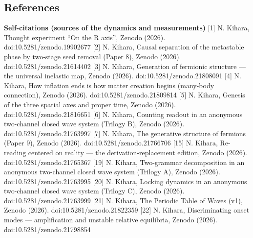 \documentclass[
]{article}
\begin{document}
\subsection{References}\label{references}

\textbf{Self-citations (sources of the dynamics and measurements)}
{[}1{]} N. Kihara, Thought experiment ``On the R axis'', Zenodo (2026).
doi:10.5281/zenodo.19902677 {[}2{]} N. Kihara, Causal separation of the
metastable phase by two-stage seed removal (Paper 8), Zenodo (2026).
doi:10.5281/zenodo.21614402 {[}3{]} N. Kihara, Generation of fermionic
structure --- the universal inelastic map, Zenodo (2026).
doi:10.5281/zenodo.21808091 {[}4{]} N. Kihara, How inflation ends is how
matter creation begins (many-body connection), Zenodo (2026).
doi:10.5281/zenodo.21809814 {[}5{]} N. Kihara, Genesis of the three
spatial axes and proper time, Zenodo (2026). doi:10.5281/zenodo.21816651
{[}6{]} N. Kihara, Counting readout in an anonymous two-channel closed
wave system (Trilogy B), Zenodo (2026). doi:10.5281/zenodo.21763997
{[}7{]} N. Kihara, The generative structure of fermions (Paper 9),
Zenodo (2026). doi:10.5281/zenodo.21766706 {[}15{]} N. Kihara,
Re-reading centered on reality --- the derivation-replacement edition,
Zenodo (2026). doi:10.5281/zenodo.21765367 {[}19{]} N. Kihara,
Two-grammar decomposition in an anonymous two-channel closed wave system
(Trilogy A), Zenodo (2026). doi:10.5281/zenodo.21763995 {[}20{]} N.
Kihara, Locking dynamics in an anonymous two-channel closed wave system
(Trilogy C), Zenodo (2026). doi:10.5281/zenodo.21763999 {[}21{]} N.
Kihara, The Periodic Table of Waves (v1), Zenodo (2026).
doi:10.5281/zenodo.21822359 {[}22{]} N. Kihara, Discriminating onset
modes --- amplification and unstable relative equilibria, Zenodo (2026).
doi:10.5281/zenodo.21798854
\end{document}
